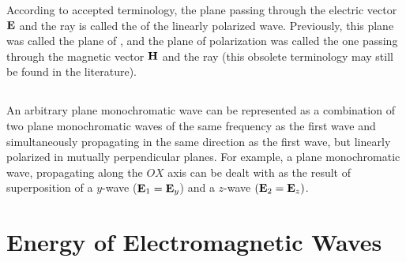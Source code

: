 According to accepted  terminology, the plane passing through the electric vector $\vb{E}$ and the ray is called the  of the linearly polarized wave. Previously, this plane was called the plane of , and the plane of polarization was called the one passing through the magnetic vector $\vb{H}$ and the ray (this obsolete terminology may still be found in the literature).


\subsection{}\label{31.1.8} An arbitrary plane monochromatic wave can be represented as a combination of two plane monochromatic waves of the same frequency as the first wave and simultaneously propagating in the same direction as the first wave, but linearly polarized in mutually perpendicular planes. For example, a plane monochromatic wave, propagating along the $OX$ axis  can be dealt with as the result of superposition of a
$y$-wave ($\vb{E}_{1} = \vb{E}_{y}$) and a $z$-wave $(\vb{E}_{2} = \vb{E}_{z})$.


\section{Energy of Electromagnetic Waves}
\label{sec-31.2} 

